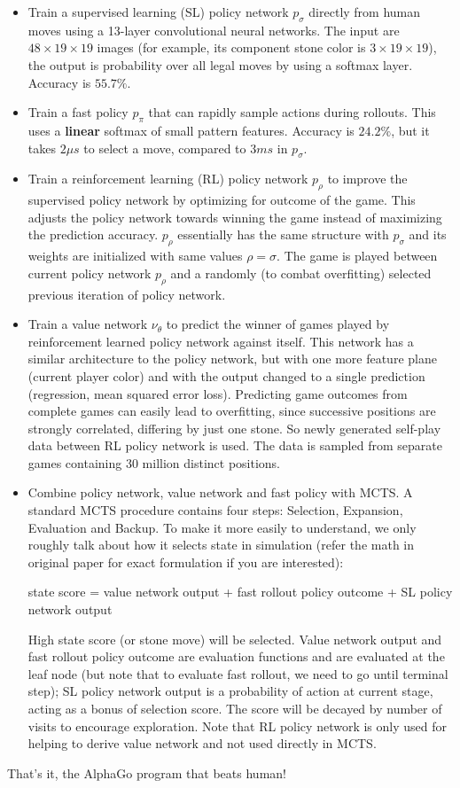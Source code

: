 \documentclass[11pt]{article}
\begin{document}
\begin{itemize}
\item Train a supervised learning (SL) policy network $p_{\sigma}$ directly from human moves using a 13-layer convolutional neural networks. The input are $48\times 19 \times 19$ images (for example, its component stone color is $3\times 19 \times 19$), the output is probability over all legal moves by using a softmax layer. Accuracy is $55.7\%$.
\item Train a fast policy $p_{\pi}$ that can rapidly sample actions during rollouts. This uses a \textbf{linear} softmax of small pattern features. Accuracy is $24.2\%$, but it takes $2\mu s$ to select a move, compared to $3ms$ in $p_{\sigma}$.
\item Train a reinforcement learning (RL) policy network $p_{\rho}$ to improve the supervised policy network by optimizing for outcome of the game. This adjusts the policy network towards winning the game instead of maximizing the prediction accuracy. $p_{\rho}$ essentially has the same structure with $p_{\sigma}$ and its weights are initialized with same values $\rho = \sigma$. The game is played between current policy network $p_{\rho}$ and a randomly (to combat overfitting) selected previous iteration of policy network.
\item Train a value network $\nu_{\theta}$ to predict the winner of games played by reinforcement learned policy network against itself. This network has a similar architecture to the policy network, but with one more feature plane (current player color) and with the output changed to a single prediction (regression, mean squared error loss). Predicting game outcomes from complete games can easily lead to overfitting, since successive positions are strongly correlated, differing by just one stone. So newly generated self-play data between RL policy network is used. The data is sampled from separate games containing 30 million distinct positions.
\item Combine policy network, value network and fast policy with MCTS. A standard MCTS procedure contains four steps: Selection, Expansion, Evaluation and Backup. To make it more easily to understand, we only roughly talk about how it selects state in simulation (refer the math in original paper for exact formulation if you are interested): 

state score = value network output + fast rollout policy outcome + SL policy network output

High state score (or stone move) will be selected. Value network output and fast rollout policy outcome are evaluation functions and are evaluated at the leaf node (but note that to evaluate fast rollout, we need to go until terminal step); SL policy network output is a probability of action at current stage, acting as a bonus of selection score. The score will be decayed by number of visits to encourage exploration. Note that RL policy network is only used for helping to derive value network and not used directly in MCTS.  
\end{itemize}

That's it, the AlphaGo program that beats human!


\end{document}
